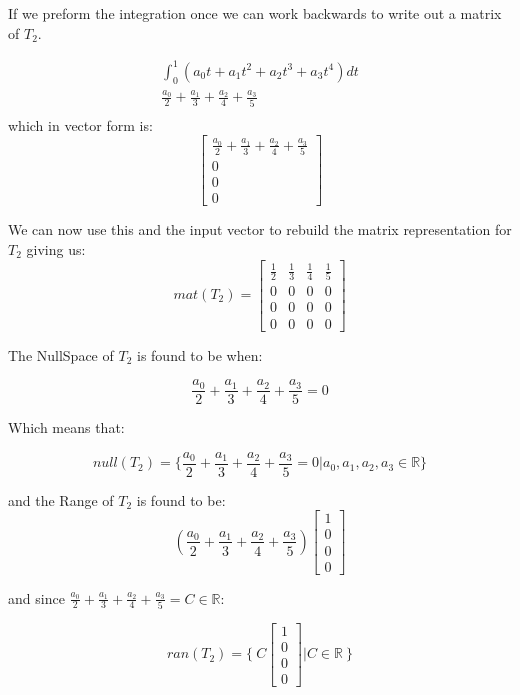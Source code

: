 \documentclass[12pt]{article}
\begin{document}
If we preform the integration once we can work backwards to write out a matrix of $T_{2}$. 

\begin{eqnarray*}
\int_{0}^{1} (a_{0}t + a_{1} t^{2} + a_{2} t^{3} + a_{3} t^{4}) dt\\
\frac{a_{0}}{2} + \frac{a_{1}}{3} + \frac{a_{2}}{4} + \frac{a_{3}}{5}\\
\end{eqnarray*}
which in vector form is:
\[
\begin{bmatrix}
\frac{a_{0}}{2} + \frac{a_{1}}{3} + \frac{a_{2}}{4} + \frac{a_{3}}{5}\\
0\\
0\\
0
\end{bmatrix}
\]

We can now use this and the input vector to rebuild the matrix representation for $T_{2}$ giving us:
\[
mat(T_{2}) =
\begin{bmatrix}
\frac{1}{2} & \frac{1}{3} & \frac{1}{4} & \frac{1}{5}\\
0 & 0 & 0 & 0\\
0 & 0 & 0 & 0\\
0 & 0 & 0 & 0
\end{bmatrix}
\]

The NullSpace of $T_{2}$ is found to be when:

$$\frac{a_{0}}{2} + \frac{a_{1}}{3} + \frac{a_{2}}{4} + \frac{a_{3}}{5} = 0 $$

Which means that:

$$ null(T_{2}) = \{ \frac{a_{0}}{2} + \frac{a_{1}}{3} + \frac{a_{2}}{4} + \frac{a_{3}}{5} = 0 | a_{0}, a_{1}, a_{2}, a_{3} \in \mathbb{R} \} $$

and the Range of $T_{2}$ is found to be:
\[
( \frac{a_{0}}{2} + \frac{a_{1}}{3} + \frac{a_{2}}{4} + \frac{a_{3}}{5} )
\begin{bmatrix}
1\\
0\\
0\\
0
\end{bmatrix}
\]

and since $\frac{a_{0}}{2} + \frac{a_{1}}{3} + \frac{a_{2}}{4} + \frac{a_{3}}{5} = C \in \mathbb{R} $:

\[
ran(T_{2}) = \{ \
C
\begin{bmatrix}
1\\
0\\
0\\
0
\end{bmatrix}
|
C \in \mathbb{R} \ \}
\]
\end{document}
